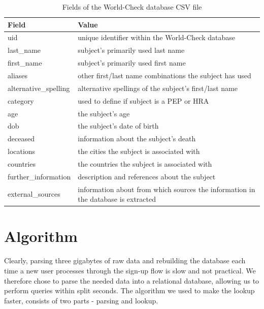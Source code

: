 \documentclass[a4paper, oneside]{csthesis}
\begin{document}
\begin{table}
    \begin{tabular}{l|p{9cm}}
    \hline
    Field & Value \\ \hline
    uid & unique identifier within the World-Check database\\ \hdashline[0.5pt/3pt]
    last\_name & subject's primarily used last name\\ \hdashline[0.5pt/3pt]
    first\_name & subject's primarily used  first name \\ \hdashline[0.5pt/3pt]
    aliases & other first/last name combinations the subject has used\\ \hdashline[0.5pt/3pt]
    alternative\_spelling & alternative spellings of the subject's first/last name\\ \hdashline[0.5pt/3pt]
    category & used to define if subject is a PEP or HRA \\ \hdashline[0.5pt/3pt]
    age & the subject's age \\ \hdashline[0.5pt/3pt]
    dob & the subject's date of birth \\ \hdashline[0.5pt/3pt]
    deceased & information about the subject's death \\ \hdashline[0.5pt/3pt]
    locations & the cities the subject is associated with \\ \hdashline[0.5pt/3pt]
    countries & the countries the subject is associated with \\ \hdashline[0.5pt/3pt]
    further\_information & description and references about the subject \\ \hdashline[0.5pt/3pt]
    external\_sources & information about from which sources the information in the database is extracted \\ \hline

    \end{tabular}

    \caption{Fields of the World-Check database CSV file}
    \label{tbl:world-check-fields}
\end{table}



\section{Algorithm}

Clearly, parsing three gigabytes of raw data and rebuilding the database each time a new user processes through the sign-up flow is slow and not practical. We therefore chose to parse the needed data into a relational database, allowing us to perform queries within split seconds. The algorithm we used to make the lookup faster, consists of two parts - parsing and lookup.
\end{document}

